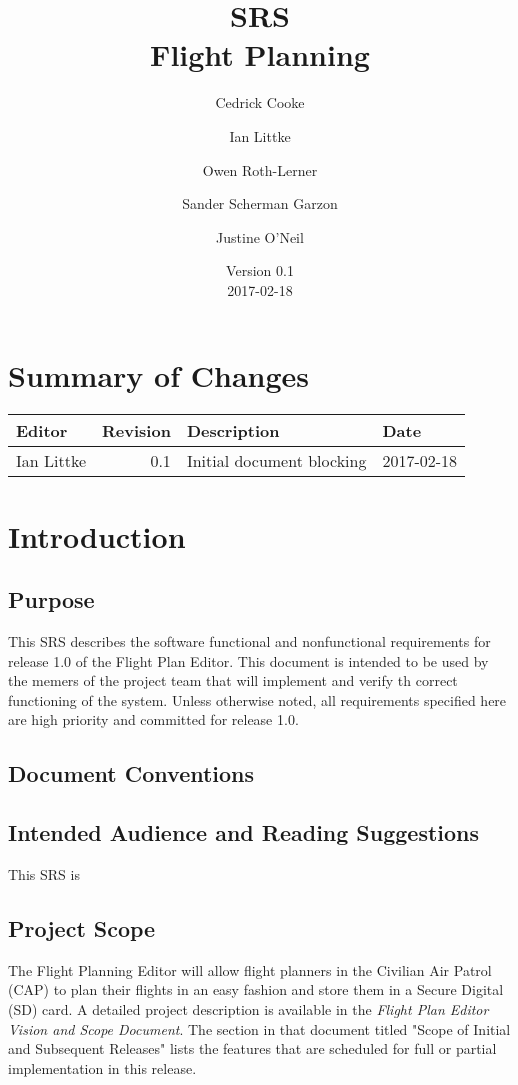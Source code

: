 \documentclass[12pt, letterpaper]{article}
\title{SRS \\
Flight Planning
}
\author{ Cedrick Cooke
    \and Ian Littke
    \and Owen Roth-Lerner
    \and Sander Scherman Garzon
    \and Justine O'Neil
}
\date{Version 0.1 \\ 2017-02-18}
\begin{document}
\maketitle

\tableofcontents

\section*{Summary of Changes}
\begin{tabularx}{\textwidth}{|l|r|X|l|}
\hline
Editor & Revision & Description & Date \\ \hline \hline
Ian Littke & 0.1 & Initial document blocking & 2017-02-18 \\ \hline
\end{tabularx}

\section{Introduction}
  \subsection{Purpose}
    This SRS describes the software functional and nonfunctional requirements
    for release 1.0 of the Flight Plan Editor.
    This document is intended to be used by the memers of the project team that will implement
    and verify th correct functioning of the system.
    Unless otherwise noted, all requirements specified here are high priority
    and committed for release 1.0.
  \subsection{Document Conventions}
  \subsection{Intended Audience and Reading Suggestions}
  This SRS is 
  
  \subsection{Project Scope}
  The Flight Planning Editor will allow flight planners in the Civilian Air Patrol (CAP)
  to plan their flights in an easy fashion and store them in a Secure Digital (SD) card.
  A detailed project description is available in the \textit{Flight Plan Editor Vision and Scope Document}.
  The section in that document titled "Scope of Initial and Subsequent Releases" lists the features that are
  scheduled for full or partial implementation in this release.
\end{document}
